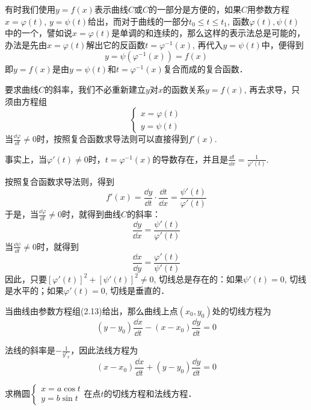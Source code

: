 有时我们使用$y=f(x)$表示曲线$C$或$C$的一部分是方便的，如果$C$用参数方程$x=\varphi(t)$, $y=\psi(t)$给出，而对于曲线的一部分$t_0\le t\le t_1$, 函数$\varphi(t),\psi(t)$中的一个，譬如说$x=\varphi(t)$是单调的和连续的，那么这样的表示法总是可能的，办法是先由$x=\varphi(t)$解出它的反函数$t=\varphi^{-1}(x)$, 再代入$y=\psi(t)$中，便得到
\[y=\psi\left(\varphi^{-1}(x)\right)=f(x)\]
即$y=f(x)$是由$y=\psi(t)$和$t=\varphi^{-1}(x)$复合而成的复合函数．

要求曲线$C$的斜率，我们不必重新建立$y$对$x$的函数关系$y=f(x)$, 再去求导，只须由方程组
\begin{equation}
    \begin{cases}
        x=\varphi(t)\\ y=\psi(t)
    \end{cases}
\end{equation}
当$\frac{\dd\varphi}{\dd t}\ne 0$时，按照复合函数求导法则可以直接得到$f'(x)$.

事实上，当$\varphi'(t)\ne 0$时，$t=\varphi^{-1}(x)$的导数存在，并且是$\frac{\dd t}{\dd 
x}=\frac{1}{\varphi'(t)}$.

按照复合函数求导法则，得到
\[f'(x)=\frac{\dd y}{\dd t}\cdot \frac{\dd t}{\dd x}=\frac{\psi'(t)}{\varphi'(t)}\]
于是，当$\frac{\dd\varphi}{\dd t}\ne 0$时，就得到曲线$C$的斜率：
\begin{equation}
    \frac{\dd y}{\dd x}=\frac{\psi'(t)}{\varphi'(t)}
\end{equation}
当$\frac{\dd\psi}{\dd t}\ne 0$时，就得到
\begin{equation}
    \frac{\dd x}{\dd y}=\frac{\varphi'(t)}{\psi'(t)}
\end{equation}
因此，只要$[\varphi'(t)]^2+[\psi'(t)]^2\ne 0$, 切线总是存在的：如果$\psi'(t)=0$, 切线是水平的；如果$\varphi'(t)=0$, 切线是垂直的．

当曲线由参数方程组(2.13)给出，那么曲线上点$(x_0,y_0)$处的切线方程为
\begin{equation}
    (y-y_0)\frac{\dd x}{\dd t}-(x-x_0)\frac{\dd y}{\dd t}=0
\end{equation}

法线的斜率是$-\frac{1}{y'_x}$，因此法线方程为
\begin{equation}
    (x-x_0)\frac{\dd x}{\dd t}+(y-y_0)\frac{\dd y}{\dd t}=0
\end{equation}

\begin{example}
求椭圆$\begin{cases}
    x=a\cos t\\ y=b\sin t
\end{cases}$在点$t$的切线方程和法线方程．
\end{example}



